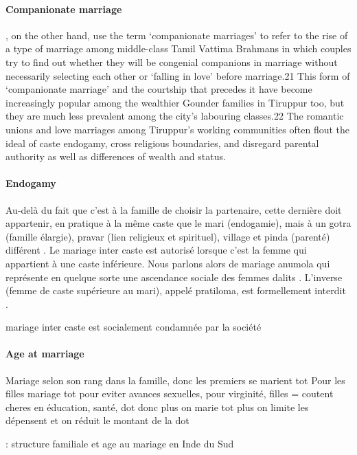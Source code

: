 \documentclass[a4paper, 11pt, onecolumn]{article}
\begin{document}
\paragraph{Companionate marriage}
\cite{Fuller2008}, on the other hand, use the term
‘companionate marriages’ to refer to the rise of a type of marriage
among middle-class Tamil Vattima Brahmans in which couples try
to find out whether they will be congenial companions in marriage
without necessarily selecting each other or ‘falling in love’ before
marriage.21 This form of ‘companionate marriage’ and the courtship
that precedes it have become increasingly popular among the
wealthier Gounder families in Tiruppur too, but they are much less
prevalent among the city’s labouring classes.22 The romantic unions
and love marriages among Tiruppur’s working communities often flout
the ideal of caste endogamy, cross religious boundaries, and disregard
parental authority as well as differences of wealth and status.


\paragraph{Endogamy}
Au-delà du fait que c’est à la famille de choisir la partenaire, cette dernière doit appartenir,
en pratique à la même caste que le mari (endogamie), mais à un gotra (famille élargie), pravar
(lien religieux et spirituel), village et pinda (parenté) différent \cite{Aiyar1937}.
Le mariage inter caste est autorisé lorsque c’est la femme qui appartient à une caste inférieure. Nous parlons alors
de mariage anumola qui représente en quelque sorte une ascendance sociale des femmes dalits \cite{Ahuja2015}. L’inverse (femme de caste supérieure au mari), appelé pratiloma, est formellement interdit \cite{Aiyar1937}.

mariage inter caste est socialement condamnée par la société \citep{James2015}

\paragraph{Age at marriage}
Mariage selon son rang dans la famille, donc les premiers se marient tot \cite{Field2008}
Pour les filles mariage tot pour eviter avances sexuelles, pour virginité, filles = coutent cheres en éducation, santé, dot donc plus on marie tot plus on limite les dépensent et on réduit le montant de la dot \cite{Jensen2003}

\cite{Reddy1991} : structure familiale et age au mariage en Inde du Sud
\end{document}
